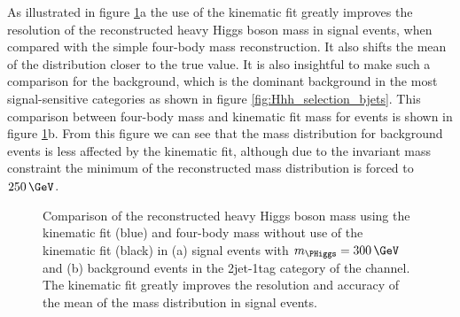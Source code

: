 As illustrated in figure \ref{fig:kinfitvsmjj}a the use of the kinematic fit greatly
improves the resolution of the reconstructed heavy Higgs boson mass in signal events, when 
compared with the simple four-body mass reconstruction. It also shifts the mean of the
distribution closer to the true value. It is also insightful to make such a comparison
for the \ttbar background, which is the dominant background in the most signal-sensitive categories as 
shown in figure \ref{fig:Hhh_selection_bjets}. This comparison between four-body mass and
kinematic fit mass for \ttbar events is shown in figure 
\ref{fig:kinfitvsmjj}b. From this figure we can see that the mass distribution for
background events is less affected by the kinematic fit, although due to the
invariant mass constraint the minimum of the reconstructed mass distribution
is forced to $250\,\GeV$.

\begin{figure}[h!]
\begin{center}
\end{center}
\caption[Comparison of the reconstructed heavy Higgs boson mass
using the kinematic fit in signal events with $m_{\PHiggs}=300\,\GeV$ and \ttbar 
background events in the 2jet-1tag category of the \mutau channel.]{Comparison of the reconstructed heavy Higgs boson mass using the kinematic fit (blue) and
four-body mass without use of the kinematic fit (black) in (a) signal events with $m_{\PHiggs} = 300\,\GeV$ and (b) \ttbar background events in 
the 2jet-1tag category of the \mutau channel. The kinematic fit greatly improves the resolution and 
accuracy of the mean of the mass distribution in signal events.}
\label{fig:kinfitvsmjj}
\end{figure}


